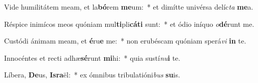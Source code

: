 \item Vide humilitátem meam, et la\textbf{bó}rem \textbf{me}um:~* et dimítte univérsa delíc\textit{ta} \textbf{me}a.
\item Réspice inimícos meos quóniam mul\textbf{ti}pli\textbf{cá}\textbf{ti} sunt:~* et ódio iníquo \textit{o}\textbf{dé}runt me.
\item Custódi ánimam meam, et \textbf{é}ru\textbf{e} me:~* non erubéscam quóniam sperá\textit{vi} \textbf{in} te.
\item Innocéntes et recti adhæ\textbf{sé}runt \textbf{mi}hi:~* quia sustí\textit{nu}\textbf{i} te.
\item Líbera, \textbf{De}us, \textbf{Is}\textbf{ra}ël:~* ex ómnibus tribulatióni\textit{bus} \textbf{su}is.
